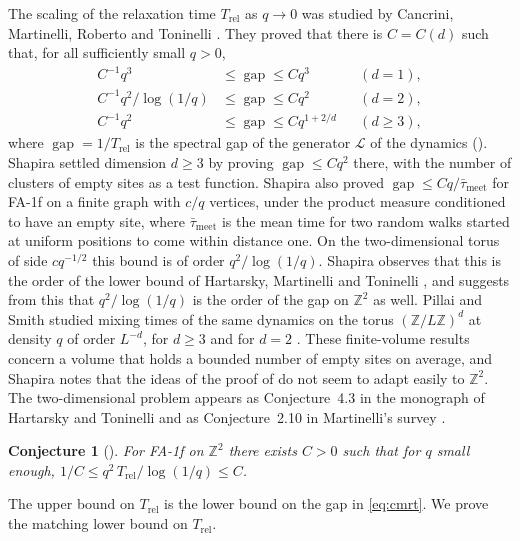 \documentclass[11pt]{article}
\newtheorem{conjecture}[theorem]{Conjecture}
\theoremstyle{remark}
\newcommand{\Z}{\mathbb Z}
\newcommand{\1}{\mathbf 1}
\DeclareMathOperator{\gap}{gap}
\newcommand{\Trel}{T_{\mathrm{rel}}}
\begin{document}
The scaling of the relaxation time $\Trel$ as $q\to0$ was studied by Cancrini, Martinelli, Roberto and Toninelli \cite[Theorem~6.4]{CMRT}. They proved that there is $C=C(d)$ such that, for all sufficiently small $q>0$,
\begin{equation}\label{eq:cmrt}
\begin{aligned}
C^{-1}q^3&\le\gap\le Cq^3 && (d=1),\\
C^{-1}q^2/\log(1/q)&\le\gap\le Cq^2 && (d=2),\\
C^{-1}q^2&\le\gap\le Cq^{1+2/d} && (d\ge3),
\end{aligned}
\end{equation}
where $\gap=1/\Trel$ is the spectral gap of the generator $\mathcal L$ of the dynamics (). Shapira \cite[Theorem~1.1]{Sh} settled dimension $d\ge3$ by proving $\gap\le Cq^2$ there, with the number of clusters of empty sites as a test function. Shapira also proved \cite[Theorem~1.2]{Sh} $\gap\le Cq/\bar\tau_{\mathrm{meet}}$ for FA-1f on a finite graph with $c/q$ vertices, under the product measure conditioned to have an empty site, where $\bar\tau_{\mathrm{meet}}$ is the mean time for two random walks started at uniform positions to come within distance one. On the two-dimensional torus of side $cq^{-1/2}$ this bound is of order $q^2/\log(1/q)$. Shapira observes \cite[Remarks~1.3 and~4.4]{Sh} that this is the order of the lower bound of Hartarsky, Martinelli and Toninelli \cite{HMT}, and suggests from this that $q^2/\log(1/q)$ is the order of the gap on $\Z^2$ as well. Pillai and Smith studied mixing times of the same dynamics on the torus $(\Z/L\Z)^d$ at density $q$ of order $L^{-d}$, for $d\ge3$ \cite{PS17} and for $d=2$ \cite{PS19}. These finite-volume results concern a volume that holds a bounded number of empty sites on average, and Shapira notes that the ideas of the proof of \cite[Theorem~1.2]{Sh} do not seem to adapt easily to $\Z^2$. The two-dimensional problem appears as Conjecture~4.3 in the monograph of Hartarsky and Toninelli \cite{HT} and as Conjecture~2.10 in Martinelli's survey \cite{Ma}.

\begin{conjecture}[{\cite[Conjecture~4.3]{HT}}]\label{conj:HT}
For FA-1f on $\Z^2$ there exists $C>0$ such that for $q$ small enough,
$1/C\le q^2\,\Trel/\log(1/q)\le C$.
\end{conjecture}

The upper bound on $\Trel$ is the lower bound on the gap in \eqref{eq:cmrt}. We prove the matching lower bound on $\Trel$.
\end{document}
